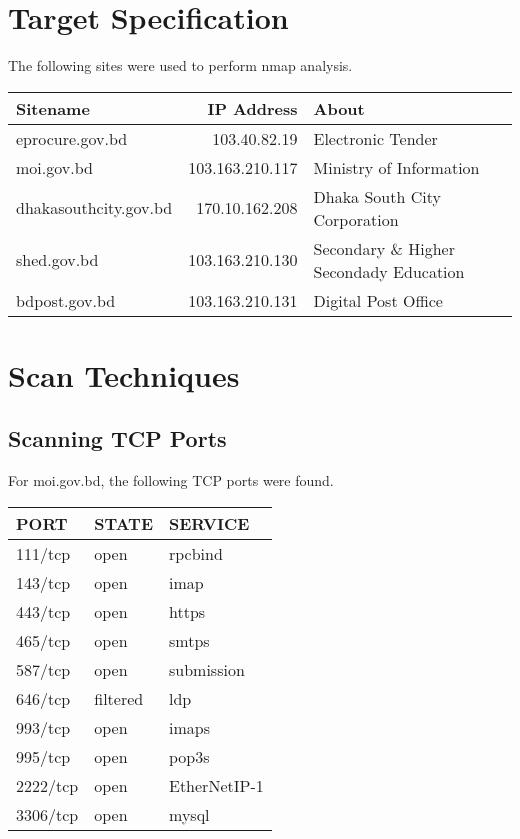 \documentclass[11pt]{article}
\begin{document}
\section{Target Specification}
\label{sec:orge0912ae}
The following sites were used to perform nmap analysis.\\
\begin{center}
\begin{tabular}{lrl}
Sitename & IP Address & About\\
\hline
eprocure.gov.bd & 103.40.82.19 & Electronic Tender\\
moi.gov.bd & 103.163.210.117 & Ministry of Information\\
dhakasouthcity.gov.bd & 170.10.162.208 & Dhaka South City Corporation\\
shed.gov.bd & 103.163.210.130 & Secondary \& Higher Secondady Education\\
bdpost.gov.bd & 103.163.210.131 & Digital Post Office\\
\end{tabular}
\end{center}
\section{Scan Techniques}
\label{sec:org23fb1eb}
\subsection{Scanning TCP Ports}
\label{sec:org74333dc}
For moi.gov.bd, the following TCP ports were found.\\
\begin{center}
\begin{tabular}{lll}
PORT & STATE & SERVICE\\
\hline
111/tcp & open & rpcbind\\
143/tcp & open & imap\\
443/tcp & open & https\\
465/tcp & open & smtps\\
587/tcp & open & submission\\
646/tcp & filtered & ldp\\
993/tcp & open & imaps\\
995/tcp & open & pop3s\\
2222/tcp & open & EtherNetIP-1\\
3306/tcp & open & mysql\\
\end{tabular}
\end{center}
\end{document}
